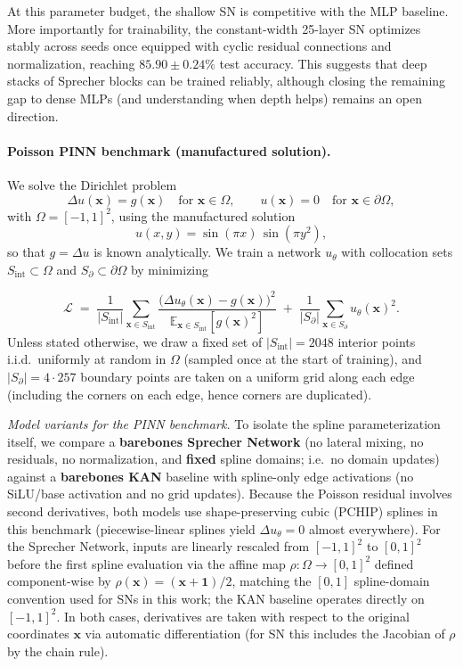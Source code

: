 \documentclass{article}
\theoremstyle{plain}
\theoremstyle{definition}
\theoremstyle{remark}
\begin{document}
At this parameter budget, the shallow SN is competitive with the MLP baseline. More importantly for trainability, the constant-width 25-layer SN optimizes stably across seeds once equipped with cyclic residual connections and normalization, reaching $85.90\pm 0.24\%$ test accuracy. This suggests that deep stacks of Sprecher blocks can be trained reliably, although closing the remaining gap to dense MLPs (and understanding when depth helps) remains an open direction.

\paragraph{Poisson PINN benchmark (manufactured solution).}\label{sec:pinn_poisson}
We solve the Dirichlet problem
$$\Delta u(\mathbf{x}) = g(\mathbf{x}) \quad \text{for } \mathbf{x}\in \Omega,\qquad
u(\mathbf{x})=0 \quad \text{for } \mathbf{x}\in \partial\Omega,$$
with $\Omega=[-1,1]^2$, using the manufactured solution
$$u(x,y) = \sin(\pi x)\,\sin(\pi y^2),$$
so that $g=\Delta u$ is known analytically.
We train a network $u_\theta$ with collocation sets $S_{\mathrm{int}}\subset\Omega$ and $S_{\partial}\subset\partial\Omega$ by minimizing

$$\mathcal{L} \;=\;
\frac{1}{|S_{\mathrm{int}}|}\sum_{\mathbf{x}\in S_{\mathrm{int}}}
\frac{\bigl(\Delta u_\theta(\mathbf{x})-g(\mathbf{x})\bigr)^2}{\mathbb{E}_{\mathbf{x}\in S_{\mathrm{int}}}[g(\mathbf{x})^2]}
\;+\;
\frac{1}{|S_{\partial}|}\sum_{\mathbf{x}\in S_{\partial}} u_\theta(\mathbf{x})^2.$$
Unless stated otherwise, we draw a fixed set of $|S_{\mathrm{int}}|=2048$ interior points i.i.d.\ uniformly at random in $\Omega$ (sampled once at the start of training), and
$|S_{\partial}|=4\cdot 257$ boundary points are taken on a uniform grid along each edge (including the corners on each edge, hence corners are duplicated).

\emph{Model variants for the PINN benchmark.}
To isolate the spline parameterization itself, we compare a \textbf{barebones Sprecher Network} (no lateral mixing, no residuals, no normalization, and \textbf{fixed} spline domains; i.e.\ no domain updates) against a \textbf{barebones KAN} baseline with spline-only edge activations (no SiLU/base activation and no grid updates). Because the Poisson residual involves second derivatives, both models use shape-preserving cubic (PCHIP) splines in this benchmark (piecewise-linear splines yield $\Delta u_\theta=0$ almost everywhere).
For the Sprecher Network, inputs are linearly rescaled from $[-1,1]^2$ to $[0,1]^2$ before the first spline evaluation via the affine map $\rho:\Omega\to[0,1]^2$ defined component-wise by $\rho(\mathbf{x})=(\mathbf{x}+\mathbf{1})/2$, matching the $[0,1]$ spline-domain convention used for SNs in this work; the KAN baseline operates directly on $[-1,1]^2$. In both cases, derivatives are taken with respect to the original coordinates $\mathbf{x}$ via automatic differentiation (for SN this includes the Jacobian of $\rho$ by the chain rule).
\end{document}
